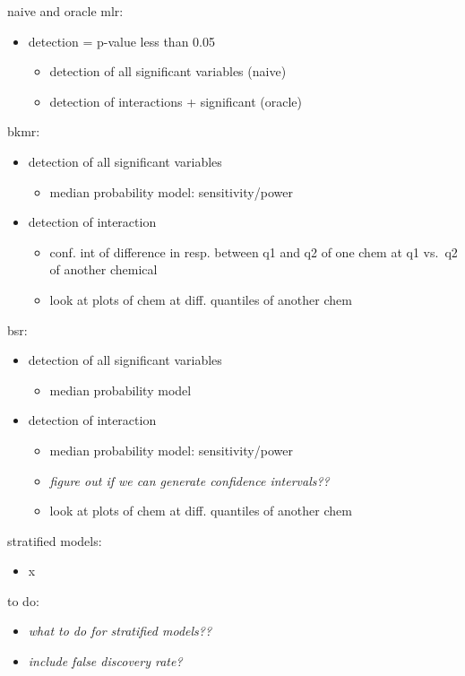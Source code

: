 \documentclass[12pt, twoside]{amherstthesis}
\providecommand{\tightlist}{%
  \setlength{\itemsep}{0pt}\setlength{\parskip}{0pt}}
\begin{document}
naive and oracle mlr:
\begin{itemize}
\tightlist
\item
  detection = p-value less than 0.05
  \begin{itemize}
  \tightlist
  \item
    detection of all significant variables (naive)
  \item
    detection of interactions + significant (oracle)
  \end{itemize}
\end{itemize}
bkmr:
\begin{itemize}
\tightlist
\item
  detection of all significant variables
  \begin{itemize}
  \tightlist
  \item
    median probability model: sensitivity/power
  \end{itemize}
\item
  detection of interaction
  \begin{itemize}
  \tightlist
  \item
    conf. int of difference in resp. between q1 and q2 of one chem at q1 vs.~q2 of another chemical
  \item
    look at plots of chem at diff. quantiles of another chem
  \end{itemize}
\end{itemize}
bsr:
\begin{itemize}
\tightlist
\item
  detection of all significant variables
  \begin{itemize}
  \tightlist
  \item
    median probability model
  \end{itemize}
\item
  detection of interaction
  \begin{itemize}
  \tightlist
  \item
    median probability model: sensitivity/power
  \item
    \emph{figure out if we can generate confidence intervals??}
  \item
    look at plots of chem at diff. quantiles of another chem
  \end{itemize}
\end{itemize}
stratified models:
\begin{itemize}
\tightlist
\item
  x
\end{itemize}
to do:
\begin{itemize}
\tightlist
\item
  \emph{what to do for stratified models??}
\item
  \emph{include false discovery rate?}
\end{itemize}
\end{document}
